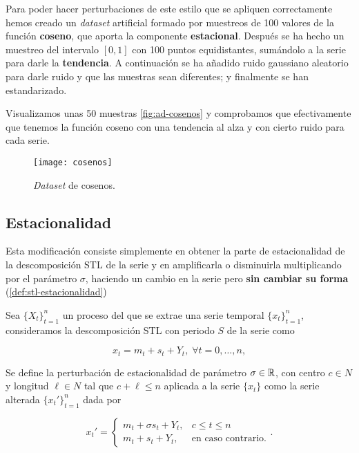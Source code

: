 Para poder hacer perturbaciones de este estilo que se apliquen correctamente hemos creado un \emph{dataset} artificial formado por muestreos de 100 valores de la función \textbf{coseno}, que aporta la componente \textbf{estacional}. Después se ha hecho un muestreo del intervalo $[0, 1]$ con 100 puntos equidistantes, sumándolo a la serie para darle la \textbf{tendencia}. A continuación se ha añadido ruido gaussiano aleatorio para darle ruido y que las muestras sean diferentes; y finalmente se han estandarizado.

Visualizamos unas 50 muestras \autoref{fig:ad-cosenos} y comprobamos que efectivamente que tenemos la función coseno con una tendencia al alza y con cierto ruido para cada serie.

\begin{figure}[htpb]
  \centering
  \texttt{[image: cosenos]}
  \caption{\emph{Dataset} de cosenos.}
  \label{fig:ad-cosenos}
\end{figure}

\subsection{Estacionalidad}

Esta modificación consiste simplemente en obtener la parte de estacionalidad de la descomposición STL de la serie y en amplificarla o disminuirla multiplicando por el parámetro $\sigma$, haciendo un cambio en la serie pero \textbf{sin cambiar su forma} (\autoref{def:stl-estacionalidad})

\begin{definicion}
  Sea $\{X_t\}_{t = 1}^n$ un proceso del que se extrae una serie temporal $\{x_t\}_{t = 1}^n$, consideramos la descomposición STL con periodo $S$ de la serie como

  $$x_t = m_t + s_t + Y_t, \; \forall t = 0, \ldots, n,$$

  Se define la perturbación de estacionalidad de parámetro $\sigma \in \mathbb{R}$, con centro $c \in N$ y longitud $\ell \in N$ tal que $c + \ell \leq n$ aplicada a la serie $\{x_t\}$ como la serie alterada $\{x_t'\}_{t = 1}^n$ dada por

  $$x_t' = \begin{cases}
    m_t + \sigma s_{t} + Y_t, & c \leq t \leq n \\
    m_t + s_t + Y_t, & \text{en caso contrario.}
  \end{cases}.$$
  \label{def:stl-estacionalidad}
\end{definicion}

